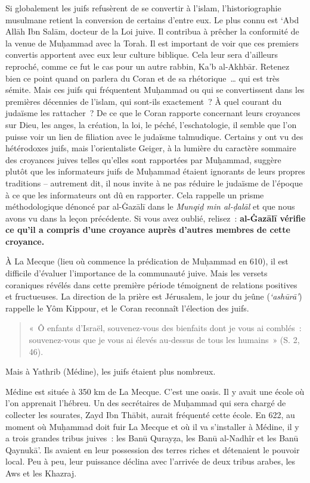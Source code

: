 Si globalement les juifs refusèrent de se convertir à l'islam,
l'historiographie musulmane retient la conversion de certains d'entre
eux. Le plus connu est `Abd Allāh Ibn Salām, docteur de la Loi juive. Il
contribua à prêcher la conformité de la venue de Muḥammad avec la Torah.
Il est important de voir que ces premiers convertis apportent avec eux
leur culture biblique. Cela leur sera d'ailleurs reproché, comme ce fut
le cas pour un autre rabbin, Ka'b al-Akhbār. Retenez bien ce point quand
on parlera du Coran et de sa rhétorique~\ldots{} qui est très sémite.
Mais ces juifs qui fréquentent Muḥammad ou qui se convertissent dans les
premières décennies de l'islam, qui sont-ils exactement~? À quel courant
du judaïsme les rattacher~? De ce que le Coran rapporte concernant leurs
croyances sur Dieu, les anges, la création, la loi, le péché,
l'eschatologie, il semble que l'on puisse voir un lien de filiation avec
le judaïsme talmudique. Certains y ont vu des hétérodoxes juifs, mais
l'orientaliste Geiger, à la lumière du
caractère sommaire des croyances juives telles qu'elles sont rapportées
par Muḥammad, suggère plutôt que les informateurs juifs de Muḥammad
étaient ignorants de leurs propres traditions -- autrement dit, il nous
invite à ne pas réduire le judaïsme de l'époque à ce que les
informateurs ont dû en rapporter. Cela rappelle un prisme méthodologique
dénoncé par al-Ġazālī \label{theol:AlGazali24} dans le \emph{Munqiḏ min al-ḍalāl} et que nous
avons vu dans la leçon précédente. Si vous avez oublié, relisez~:
\textbf{al-Ġazālī vérifie ce qu'il a compris d'une croyance auprès
d'autres membres de cette croyance.}

À La Mecque (lieu où commence la prédication de Muḥammad en 610), il est
difficile d'évaluer l'importance de la communauté juive. Mais les
versets coraniques révélés dans cette première période témoignent de
relations positives et fructueuses. La direction de la prière est
Jérusalem, le jour du jeûne (\emph{`ashūrā'}) rappelle le Yôm Kippour,
et le Coran reconnaît l'élection des juifs.
\begin{quote}
    «~Ô enfants d'Israël, souvenez-vous des bienfaits dont je vous ai
comblés~: souvenez-vous que je vous ai élevés au-dessus de tous les
humains~» (S. 2, 46).
\end{quote}


Mais à Yathrib (Médine), les juifs étaient plus nombreux.

Médine est située à 350 km de La Mecque. C'est une oasis. Il y avait une
école où l'on apprenait l'hébreu. Un des secrétaires de Muḥammad qui
sera chargé de collecter les sourates, Zayd Ibn Thābit, aurait fréquenté
cette école. En 622, au moment où Muḥammad doit fuir La Mecque et où il
va s'installer à Médine, il y a trois grandes tribus juives~: les Banū
Qurayẓa, les Banū al-Nadhîr et les Banū Qaynukā'. Ils avaient en leur
possession des terres riches et détenaient le pouvoir local. Peu à peu,
leur puissance déclina avec l'arrivée de deux tribus arabes, les Aws et
les Khazraj.

